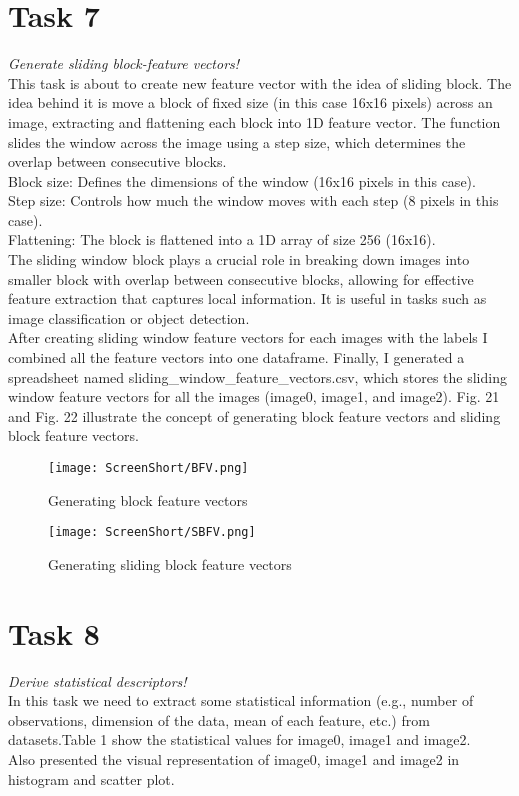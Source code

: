 \documentclass[conference,12pt]{IEEEtran}
\begin{document}
\section{Task 7}
\textit{Generate sliding block-feature vectors!}\\
This task is about to create new feature vector with the idea of sliding block. The idea behind it is move a block of fixed size (in this case 16x16 pixels) across an image, extracting and flattening each block into 1D feature vector. The function slides the window across the image using a step size, which determines the overlap between consecutive blocks. \\
Block size: Defines the dimensions of the window (16x16 pixels in this case).\\
Step size: Controls how much the window moves with each step (8 pixels in this case).\\
Flattening: The block is flattened into a 1D array of size 256 (16x16).\\
The sliding window block plays a crucial role in breaking down images into smaller block with overlap between consecutive blocks, allowing for effective feature extraction that captures local information. It is useful in tasks such as image classification or object detection.\\
After creating sliding window feature vectors for each images with the labels I combined all the feature vectors into one dataframe. Finally, I generated a spreadsheet named sliding\_window\_feature\_vectors.csv, which stores the  sliding window feature vectors for all the images (image0, image1, and image2). Fig. 21 and Fig. 22 illustrate the concept of generating block feature vectors and sliding block feature vectors.
\begin{figure}[h]
    \centering
    \texttt{[image: ScreenShort/BFV.png]}
    \caption{Generating block feature vectors}
\end{figure}
\begin{figure}[h]
    \centering
    \texttt{[image: ScreenShort/SBFV.png]}
    \caption{Generating sliding block feature vectors}
\end{figure}

\section{Task 8}
\textit{Derive statistical descriptors!}\\
In this task we need to extract some  statistical information (e.g., number of observations, dimension of the data, mean of each feature, etc.) from datasets.Table 1 show the statistical values for image0, image1 and image2.\\
Also presented the visual representation of image0, image1 and image2 in histogram and scatter plot.
\end{document}
